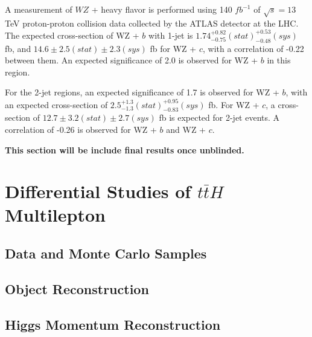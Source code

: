 \documentclass[12pt]{report}	%
\theoremstyle{definition}
\theoremstyle{remark}
\begin{document}
A measurement of $WZ$ + heavy flavor is performed using 140 $fb^{-1}$ of $\sqrt{s} = 13$ TeV proton-proton collision data collected by the ATLAS detector at the LHC. The expected cross-section of WZ + $b$ with 1-jet is $1.74^{+0.82}_{-0.75}(stat)^{+0.53}_{-0.48}(sys)$ fb, and $14.6 \pm 2.5 (stat) \pm 2.3 (sys)$ fb for WZ + $c$, with a correlation of -0.22 between them. An expected significance of 2.0 is observed for WZ + $b$ in this region.

For the 2-jet regions, an expected significance of 1.7 is observed for WZ + $b$, with an expected cross-section of $2.5^{+1.3}_{-1.3}(stat)^{+0.95}_{-0.83}(sys)$ fb. For WZ + $c$, a cross-section of $12.7 \pm 3.2 (stat) \pm 2.7 (sys)$ fb is expected for 2-jet events. A correlation of -0.26 is observed for WZ + $b$ and WZ + $c$.

\textbf{This section will be include final results once unblinded.}


\chapter{Differential Studies of $t\bar{t}H$ Multilepton }
\label{part:analysis}


\section{Data and Monte Carlo Samples}
\label{sec:dataMC}



\section{Object Reconstruction}
\label{sec:objReco}



\section{Higgs Momentum Reconstruction}
\label{sec:mva}

\end{document}
